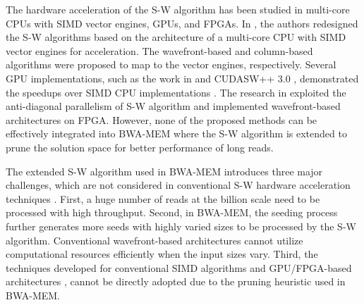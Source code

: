 The hardware acceleration of the S-W algorithm has been studied in multi-core CPUs with SIMD vector engines, GPUs, and FPGAs. 
In \cite{Wozniak1997}\cite{Farrar2007}\cite{Rognes2011}, 
the authors redesigned the S-W algorithms based on the architecture of a multi-core CPU with SIMD vector engines for acceleration. 
The wavefront-based \cite{Wozniak1997} and column-based \cite{Farrar2007}\cite{Rognes2011} algorithms were proposed to map to the vector engines, respectively.
Several GPU implementations, such as the work in \cite{Manavski2008} and CUDASW++ 3.0 \cite{Liu2013}, demonstrated the speedups over SIMD CPU implementations \cite{Farrar2007}\cite{Rognes2011}.
The research in \cite{Preusser2012}\cite{RaceLogic}\cite{Zhang2007}\cite{Yu2005}\cite{Kim2011} exploited the anti-diagonal parallelism of S-W algorithm 
and implemented wavefront-based architectures on FPGA.
However, none of the proposed methods can be effectively integrated into BWA-MEM where the S-W algorithm is extended
to prune the solution space for better performance of long reads.

The extended S-W algorithm used in BWA-MEM introduces three major challenges, which are not considered in conventional S-W hardware acceleration techniques \cite{Wozniak1997}\cite{Farrar2007}\cite{Rognes2011}\cite{Manavski2008}\cite{Liu2013}\cite{Preusser2012}\cite{RaceLogic}\cite{Zhang2007}\cite{Yu2005}\cite{Kim2011}. 
First, a huge number of reads at the billion scale need to be processed with high throughput.
Second, in BWA-MEM, the seeding process further generates more seeds with highly varied sizes to be processed by the S-W algorithm. 
Conventional wavefront-based architectures cannot utilize computational resources efficiently when the input sizes vary. 
Third, the techniques developed for conventional SIMD algorithms \cite{Wozniak1997}\cite{Farrar2007}\cite{Rognes2011} 
and GPU/FPGA-based architectures \cite{Manavski2008}\cite{Liu2013}\cite{Preusser2012}\cite{RaceLogic}\cite{Zhang2007}\cite{Yu2005}\cite{Kim2011}, 
cannot be directly adopted due to the pruning heuristic used in BWA-MEM.

